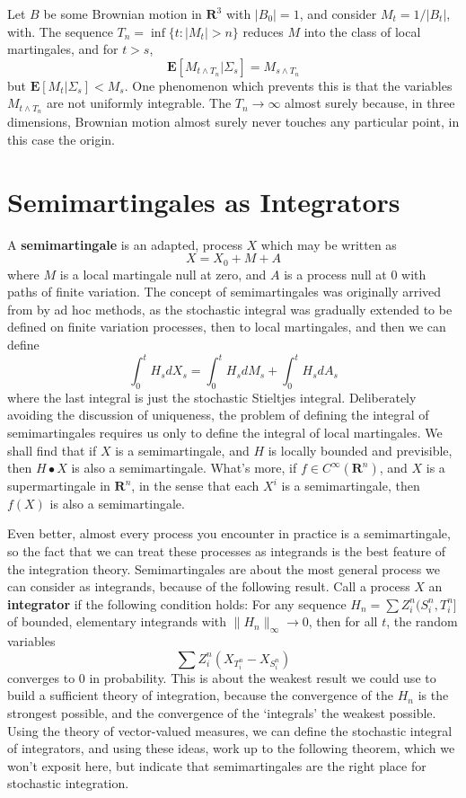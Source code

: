 \begin{example}
    Let $B$ be some Brownian motion in $\mathbf{R}^3$ with $|B_0| = 1$, and consider $M_t = 1/|B_t|$, with. The sequence $T_n = \inf \{ t : |M_t| > n \}$ reduces $M$ into the class of local martingales, and for $t > s$,
    \[ \mathbf{E}[M_{t \wedge T_n} | \Sigma_s] = M_{s \wedge T_n} \]
    but $\mathbf{E}[M_t | \Sigma_s ] < M_s$. One phenomenon which prevents this is that the variables $M_{t \wedge T_n}$ are not uniformly integrable. The $T_n \to \infty$ almost surely because, in three dimensions, Brownian motion almost surely never touches any particular point, in this case the origin.
\end{example}

\section{Semimartingales as Integrators}

A {\bf semimartingale} is an adapted, process $X$ which may be written as
%
\[ X = X_0 + M + A \]
%
where $M$ is a local martingale null at zero, and $A$ is a process null at 0 with paths of finite variation. The concept of semimartingales was originally arrived from by ad hoc methods, as the stochastic integral was gradually extended to be defined on finite variation processes, then to local martingales, and then we can define
%
\[ \int_0^t H_s dX_s = \int_0^t H_s dM_s + \int_0^t H_s dA_s \]
%
where the last integral is just the stochastic Stieltjes integral. Deliberately avoiding the discussion of uniqueness, the problem of defining the integral of semimartingales requires us only to define the integral of local martingales. We shall find that if $X$ is a semimartingale, and $H$ is locally bounded and previsible, then $H \bullet X$ is also a semimartingale. What's more, if $f \in C^\infty(\mathbf{R}^n)$, and $X$ is a supermartingale in $\mathbf{R}^n$, in the sense that each $X^i$ is a semimartingale, then $f(X)$ is also a semimartingale.

Even better, almost every process you encounter in practice is a semimartingale, so the fact that we can treat these processes as integrands is the best feature of the integration theory. Semimartingales are about the most general process we can consider as integrands, because of the following result. Call a process $X$ an {\bf integrator} if the following condition holds: For any sequence $H_n = \sum Z^n_i (S^n_i, T^n_i]$ of bounded, elementary integrands with $\| H_n \|_\infty \to 0$, then for all $t$, the random variables
%
\[ \sum Z^n_i \left( X_{T^n_i} - X_{S^n_i} \right) \]
%
converges to 0 in probability. This is about the weakest result we could use to build a sufficient theory of integration, because the convergence of the $H_n$ is the strongest possible, and the convergence of the `integrals' the weakest possible. Using the theory of vector-valued measures, we can define the stochastic integral of integrators, and using these ideas, work up to the following theorem, which we won't exposit here, but indicate that semimartingales are the right place for stochastic integration.


